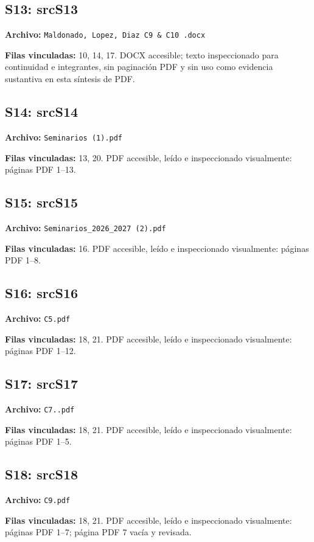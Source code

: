 \documentclass[11pt,a4paper]{article}
\begin{document}
\subsection*{\hypertarget{fuente-S13}{S13}: \csname srcS13\endcsname}
{\small\textbf{Archivo:} \texttt{Maldonado, Lopez, Diaz C9 \& C10 .docx}

\textbf{Filas vinculadas:} 10, 14, 17. DOCX accesible; texto inspeccionado para continuidad e integrantes, sin paginación PDF y sin uso como evidencia sustantiva en esta síntesis de PDF.}
\subsection*{\hypertarget{fuente-S14}{S14}: \csname srcS14\endcsname}
{\small\textbf{Archivo:} \texttt{Seminarios (1).pdf}

\textbf{Filas vinculadas:} 13, 20. PDF accesible, leído e inspeccionado visualmente: páginas PDF 1--13.}
\subsection*{\hypertarget{fuente-S15}{S15}: \csname srcS15\endcsname}
{\small\textbf{Archivo:} \texttt{Seminarios\_\allowbreak{}2026\_\allowbreak{}2027 (2).pdf}

\textbf{Filas vinculadas:} 16. PDF accesible, leído e inspeccionado visualmente: páginas PDF 1--8.}
\subsection*{\hypertarget{fuente-S16}{S16}: \csname srcS16\endcsname}
{\small\textbf{Archivo:} \texttt{C5.pdf}

\textbf{Filas vinculadas:} 18, 21. PDF accesible, leído e inspeccionado visualmente: páginas PDF 1--12.}
\subsection*{\hypertarget{fuente-S17}{S17}: \csname srcS17\endcsname}
{\small\textbf{Archivo:} \texttt{C7..pdf}

\textbf{Filas vinculadas:} 18, 21. PDF accesible, leído e inspeccionado visualmente: páginas PDF 1--5.}
\subsection*{\hypertarget{fuente-S18}{S18}: \csname srcS18\endcsname}
{\small\textbf{Archivo:} \texttt{C9.pdf}

\textbf{Filas vinculadas:} 18, 21. PDF accesible, leído e inspeccionado visualmente: páginas PDF 1--7; página PDF 7 vacía y revisada.}
\end{document}
